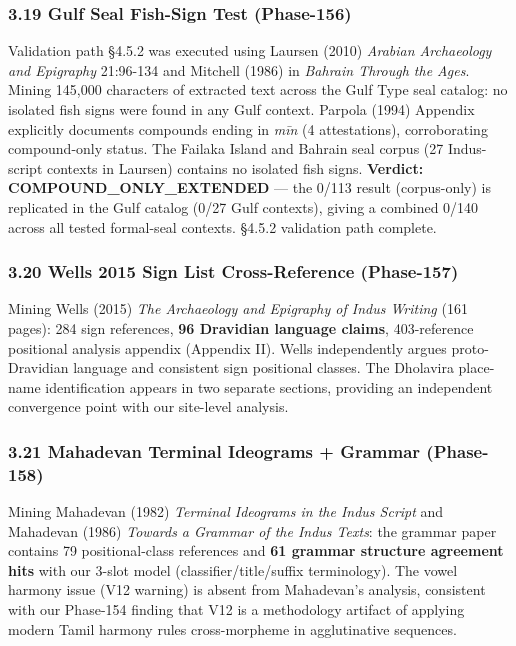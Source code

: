 \documentclass[
]{article}
\begin{document}
\subsubsection{3.19 Gulf Seal Fish-Sign Test
(Phase-156)}\label{gulf-seal-fish-sign-test-phase-156}

Validation path §4.5.2 was executed using Laursen (2010) \emph{Arabian
Archaeology and Epigraphy} 21:96-134 and Mitchell (1986) in
\emph{Bahrain Through the Ages}. Mining 145,000 characters of extracted
text across the Gulf Type seal catalog: no isolated fish signs were
found in any Gulf context. Parpola (1994) Appendix explicitly documents
compounds ending in \emph{mīn} (4 attestations), corroborating
compound-only status. The Failaka Island and Bahrain seal corpus (27
Indus-script contexts in Laursen) contains no isolated fish signs.
\textbf{Verdict: COMPOUND\_ONLY\_EXTENDED} --- the 0/113 result (corpus-only)
is replicated in the Gulf catalog (0/27 Gulf contexts), giving a combined
0/140 across all tested formal-seal contexts. §4.5.2 validation
path complete.

\subsubsection{3.20 Wells 2015 Sign List Cross-Reference
(Phase-157)}\label{wells-2015-sign-list-cross-reference-phase-157}

Mining Wells (2015) \emph{The Archaeology and Epigraphy of Indus
Writing} (161 pages): 284 sign references, \textbf{96 Dravidian language
claims}, 403-reference positional analysis appendix (Appendix II). Wells
independently argues proto-Dravidian language and consistent sign
positional classes. The Dholavira place-name identification appears in
two separate sections, providing an independent convergence point with
our site-level analysis.

\subsubsection{3.21 Mahadevan Terminal Ideograms + Grammar
(Phase-158)}\label{mahadevan-terminal-ideograms-grammar-phase-158}

Mining Mahadevan (1982) \emph{Terminal Ideograms in the Indus Script}
and Mahadevan (1986) \emph{Towards a Grammar of the Indus Texts}: the
grammar paper contains 79 positional-class references and \textbf{61
grammar structure agreement hits} with our 3-slot model
(classifier/title/suffix terminology). The vowel harmony issue (V12
warning) is absent from Mahadevan's analysis, consistent with our
Phase-154 finding that V12 is a methodology artifact of applying modern
Tamil harmony rules cross-morpheme in agglutinative sequences.
\end{document}
